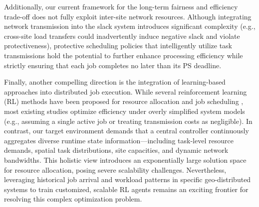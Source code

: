 Additionally, our current framework for the long-term fairness and efficiency trade-off does not fully exploit inter-site network resources. Although integrating network transmission into the slack system introduces significant complexity (e.g., cross-site load transfers could inadvertently induce negative slack and violate protectiveness), protective scheduling policies that intelligently utilize task transmissions hold the potential to further enhance processing efficiency while strictly ensuring that each job completes no later than its PS deadline.

Finally, another compelling direction is the integration of learning-based approaches into distributed job execution. While several reinforcement learning (RL) methods have been proposed for resource allocation and job scheduling \cite{wang2021incorporating, li2022drl, mohajer2024dynamic, wei2022multi}, most existing studies optimize efficiency under overly simplified system models (e.g., assuming a single active job or treating transmission costs as negligible). In contrast, our target environment demands that a central controller continuously aggregates diverse runtime state information—including task-level resource demands, spatial task distributions, site capacities, and dynamic network bandwidths. This holistic view introduces an exponentially large solution space for resource allocation, posing severe scalability challenges. Nevertheless, leveraging historical job arrival and workload patterns in specific geo-distributed systems to train customized, scalable RL agents remains an exciting frontier for resolving this complex optimization problem.


